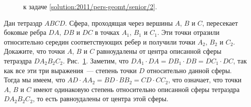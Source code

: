 \ifsolution
\begin{figure}\centering
    \caption{к задаче \ref{solution:2011/pers-geomt/senior/2}.}
    \label{fig:solution:2011/pers-geomt/senior/2}
\end{figure}
\fi %

\problem
Дан тетраэдр $ABCD$.
Сфера, проходящая через вершины $A$, $B$ и $C$, пересекает боковые ребра
$DA$, $DB$ и $DC$ в точках $A_1$, $B_1$ и $C_1$.
Эти точки отразили относительно середин соответствующих ребер и получили точки
$A_2$, $B_2$ и $C_2$.
Докажите, что точки $A$, $B$ и $C$ равноудалены от центра описанной
сферы тетраэдра $D A_2 B_2 C_2$.
\solution
\label{solution:2011/pers-geomt/senior/2}%
Рис.~\ref{fig:solution:2011/pers-geomt/senior/2}.
Заметим, что $D A_1 \cdot DA = D B_1 \cdot DB = D C_1 \cdot DC$, так как все
эти три выражения~--- степень точки $D$ относительно данной сферы.
Тогда мы имеем, что
$AD \cdot A A_2 = BD \cdot B B_2 = CD \cdot C C_2$,
что означает, что точки $A$, $B$ и $C$ имеют одинаковую степень относительно
описанной сферы тетраэдра $D A_2 B_2 C_2$, то есть равноудалены от центра этой
сферы.
\endproblem
